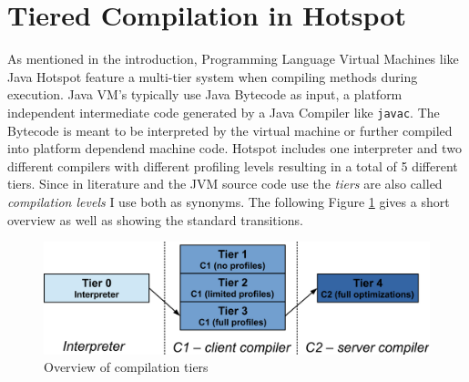 \section{Tiered Compilation in Hotspot}
\label{sec:tiered}
As mentioned in the introduction, Programming Language Virtual Machines like Java Hotspot feature a multi-tier system when compiling methods during execution. 
Java VM's typically use Java Bytecode as input, a platform independent intermediate code generated by a Java Compiler like \texttt{javac}.
The Bytecode is meant to be interpreted by the virtual machine or further compiled into platform dependend machine code.
Hotspot includes one interpreter and two different compilers with different profiling levels resulting in a total of 5 different tiers. Since in literature and the JVM source code use the \textit{tiers} are also called \textit{compilation levels} I use both as synonyms. The following Figure \ref{f:hs_tiers} gives a short overview as well as showing the standard transitions.
\begin{figure}[ht]
  \begin{center}
    \centering
    \includegraphics{figures/hs_tiers.png}
    \caption{Overview of compilation tiers}
    \label{f:hs_tiers}
  \end{center}
\end{figure}

